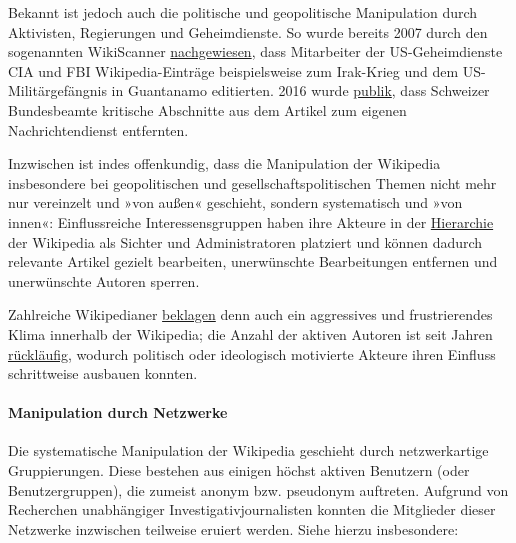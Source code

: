 Bekannt ist jedoch auch die politische und geopolitische Manipulation
durch Aktivisten, Regierungen und Geheimdienste. So wurde bereits 2007
durch den sogenannten WikiScanner
\href{https://www.reuters.com/article/us-security-wikipedia/cia-fbi-computers-used-for-wikipedia-edits-idUSN1642896020070816}{nachgewiesen},
dass Mitarbeiter der US-Geheimdienste CIA und FBI Wikipedia-Einträge
beispielsweise zum Irak-Krieg und dem US-Militärgefängnis in Guantanamo
editierten. 2016 wurde
\href{https://www.heise.de/newsticker/meldung/Beamte-der-Schweizer-Bundesverwaltung-manipulieren-Wikipedia-Texte-3098396.html}{publik},
dass Schweizer Bundesbeamte kritische Abschnitte aus dem Artikel zum
eigenen Nachrichtendienst entfernten.

Inzwischen ist indes offenkundig, dass die Manipulation der Wikipedia
insbesondere bei geopolitischen und gesellschaftspolitischen Themen
nicht mehr nur vereinzelt und »von außen« geschieht, sondern
systematisch und »von innen«: Einflussreiche Interessensgruppen haben
ihre Akteure in der
\href{https://commons.wikimedia.org/wiki/File:Vereinfachtes_Benutzergruppenschema_dewiki.svg}{Hierarchie}
der Wikipedia als Sichter und Administratoren platziert und können
dadurch relevante Artikel gezielt bearbeiten, unerwünschte Bearbeitungen
entfernen und unerwünschte Autoren sperren.

Zahlreiche Wikipedianer
\href{https://www.golem.de/news/mobbing-auf-wikipedia-content-vandalismus-drohungen-und-beschimpfung-1606-121626.html}{beklagen}
denn auch ein aggressives und frustrierendes Klima innerhalb der
Wikipedia; die Anzahl der aktiven Autoren ist seit Jahren
\href{http://www.spiegel.de/netzwelt/web/wikipedia-wird-15-nicht-nur-ein-grund-zum-feiern-a-1072059.html}{rückläufig},
wodurch politisch oder ideo­lo­gisch motivierte Akteure ihren Einfluss
schrittweise ausbauen konnten.

\hypertarget{manipulation-durch-netzwerke}{%
\paragraph{Manipulation durch
Netzwerke}\label{manipulation-durch-netzwerke}}

Die systematische Manipulation der Wikipedia geschieht durch
netzwerkartige Gruppierungen. Diese bestehen aus einigen höchst aktiven
Benutzern (oder Benutzergruppen), die zumeist anonym bzw. pseudonym
auftreten. Aufgrund von Recherchen unabhängiger
Investigativ­journalisten konnten die Mitglieder dieser Netzwerke
inzwischen teilweise eruiert werden. Siehe hierzu insbesondere:

